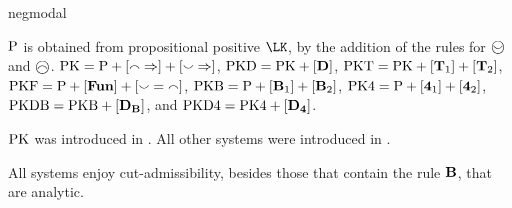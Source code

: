 \begin{entry}{negmodal}
\begin{calculus}
\end{calculus}


 \begin{clarifications}
 ${\rm {P}}$ is obtained from propositional positive $\LK$,
 by the addition of the rules for $\wsmile$ and $\wfrown$.
 {${\rm {PK}}={\rm {P}}+[{\smallfrown}\Rightarrow]+[{\smallsmile}\Rightarrow]$,}
 {${\rm {PKD}}={\rm {PK}}+[{\bf D}]$,}
 {${\rm {PKT}}={\rm {PK}}+[{\bf T}_{1}]+[{\bf T}_{2}]$,}
 {${\rm {PKF}}={\rm {P}}+[{\bf Fun}]+[{\smallsmile}={\smallfrown}]$,}
 {${\rm {PKB}}={\rm {P}}+[{\bf B}_{1}]+[{\bf B}_{2}]$,}
 {${\rm {PK4}}={\rm {P}}+[{\bf 4}_{1}]+[{\bf 4}_{2}]$,}
 {${\rm {PKDB}}={\rm {PKB}}+[{\bf D}_{{\bf B}}]$,} and
 {${\rm {PKD4}}={\rm {PK4}}+[{\bf D}_{{\bf 4}}]$.}

 \end{clarifications}

 \begin{history}
${\rm {PK}}$ was introduced in \cite{dod:mar:ENTCS2013}. All other systems were introduced in \cite{lahav_it_2016}.
 \end{history}

 \begin{technicalities}
All systems enjoy cut-admissibility, besides
those that contain the rule ${\bf B}$, that are analytic.
 \end{technicalities}



%
%
%
%
%
%
%
%




\end{entry}
